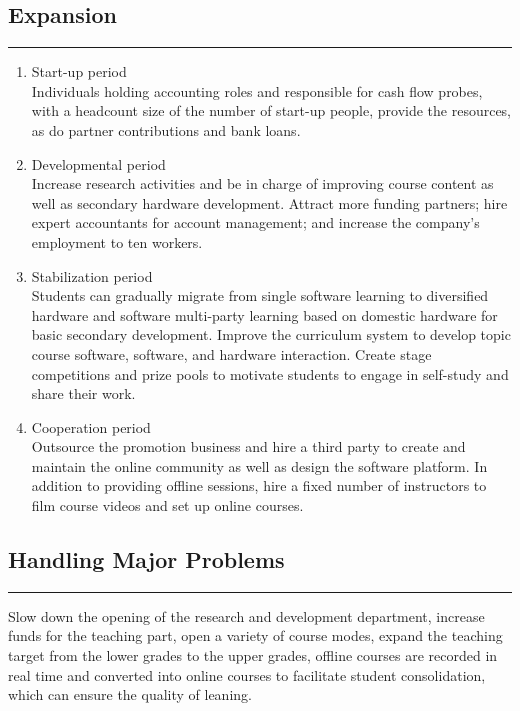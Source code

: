 \documentclass[12pt]{extarticle}
\numberwithin{figure}{section}
\begin{document}
\subsection{Expansion}
\vspace{-0.1cm}
\hrule
\vspace{0.2cm}
\begin{enumerate}
    \setlength{\itemsep}{0pt}
          \setlength{\parsep}{0pt}
          \setlength{\parskip}{0pt}
    \item Start-up period \\
          Individuals holding accounting roles and responsible for cash flow probes, with a headcount size of the number of start-up people, provide the resources, as do partner contributions and bank loans.
    \item Developmental period \\
          Increase research activities and be in charge of improving course content as well as secondary hardware development. Attract more funding partners; hire expert accountants for account management; and increase the company's employment to ten workers.
    \item Stabilization period\\
          Students can gradually migrate from single software learning to diversified hardware and software multi-party learning based on domestic hardware for basic secondary development. Improve the curriculum system to develop topic course software, software, and hardware interaction. Create stage competitions and prize pools to motivate students to engage in self-study and share their work.
    \item Cooperation period\\
          Outsource the promotion business and hire a third party to create and maintain the online community as well as design the software platform. In addition to providing offline sessions, hire a fixed number of instructors to film course videos and set up online courses.
\end{enumerate}

\subsection{Handling Major Problems}
\vspace{-0.1cm}
\hrule
\vspace{0.2cm}

Slow down the opening of the research and development department, increase funds for the teaching part, open a variety of course modes, expand the teaching target from the lower grades to the upper grades, offline courses are recorded in real time and converted into online courses to facilitate student consolidation, which can ensure the quality of leaning.
\end{document}
